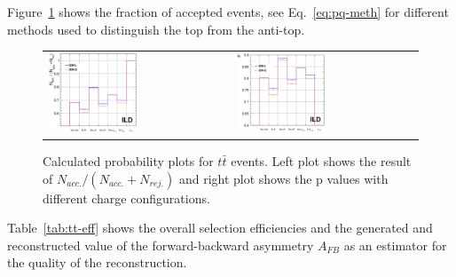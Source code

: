 \documentclass[preprint]{elsarticle}
\begin{document}
Figure~\ref{fig_eff_purity} shows the fraction of accepted events, see Eq.~\ref{eq:pq-meth}  for different methods used to distinguish the top from the anti-top.  
\begin{figure}[h!]
    \centering
    \begin{tabular}{ll}
      \includegraphics[width=0.5\textwidth]{figures_TTbar/p_value_num_l5_ele_mu.eps} & 
      \includegraphics[width=0.5\textwidth]{figures_TTbar/p_value_l5_ele_mu.eps}
    \end{tabular}
    \caption{Calculated probability plots for $t\bar{t}$ events. Left plot shows the result of $N_{acc.} / (N_{acc.} + N_{rej.})$ and right plot shows the p values with different charge configurations.}
    \label{fig_eff_purity}
  \end{figure}

Table~\ref{tab:tt-eff} shows the overall selection efficiencies and the generated and reconstructed value of the forward-backward asymmetry $A_{FB}$ as an estimator for the quality of the reconstruction.
\end{document}
